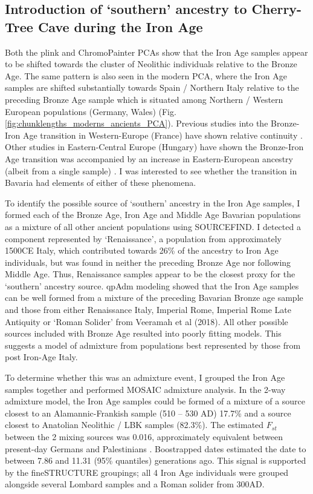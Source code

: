 \subsection{Introduction of `southern' ancestry to Cherry-Tree Cave during the Iron Age}

Both the plink and ChromoPainter PCAs show that the Iron Age samples appear to be shifted towards the cluster of Neolithic individuals relative to the Bronze Age. The same pattern is also seen in the modern PCA, where the Iron Age samples are shifted substantially towards Spain / Northern Italy relative to the preceding Bronze Age sample which is situated among Northern / Western European populations (Germany, Wales) (Fig. \ref{fig:chunklengths_moderns_ancients_PCA}). Previous studies into the Bronze-Iron Age transition in Western-Europe (France) have shown relative continuity \cite{Brunel12791}. Other studies in Eastern-Central Europe (Hungary) have shown the Bronze-Iron Age transition was accompanied by an increase in Eastern-European ancestry (albeit from a single sample) \cite{Gamba2014}. I was interested to see whether the transition in Bavaria had elements of either of these phenomena. 

To identify the possible source of `southern' ancestry in the Iron Age samples, I formed each of the Bronze Age, Iron Age and Middle Age Bavarian populations as a mixture of all other ancient populations using SOURCEFIND. I detected a component represented by `Renaissance', a population from approximately 1500CE Italy, which contributed towards 26\% of the ancestry to Iron Age individuals, but was found in neither the preceding Bronze Age nor following Middle Age. Thus, Renaissance samples appear to be the closest proxy for the `southern' ancestry source. qpAdm modeling showed that the Iron Age samples can be well formed from a mixture of the preceding Bavarian Bronze age sample and those from either Renaissance Italy, Imperial Rome, Imperial Rome Late Antiquity or `Roman Solider' from Veeramah et al (2018). All other possible sources included with Bronze Age resulted into poorly fitting models. This suggests a model of admixture from populations best represented by those from post Iron-Age Italy. 

To determine whether this was an admixture event, I grouped the Iron Age samples together and performed MOSAIC admixture analysis. In the 2-way admixture model, the Iron Age samples could be formed of a mixture of a source closest to an Alamannic-Frankish sample (510 – 530 AD) 17.7\% and a source closest to Anatolian Neolithic / LBK samples (82.3\%). The estimated $F_{st}$ between the 2 mixing sources was 0.016, approximately equivalent between present-day Germans and Palestinians \cite{nelis2009genetic}.  Boostrapped dates estimated the date to between 7.86 and 11.31 (95\% quantiles) generations ago. This signal is supported by the fineSTRUCTURE groupings; all 4 Iron Age individuals were grouped alongside several Lombard samples and a Roman solider from 300AD. 

